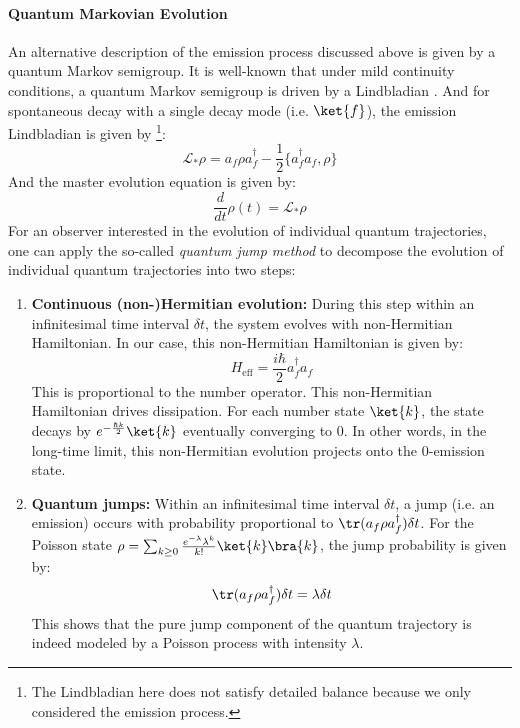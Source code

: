 \documentclass[a4paper,11pt]{article}
\theoremstyle{definition}
\numberwithin{equation}{section}
\begin{document}
\paragraph{Quantum Markovian Evolution} An alternative description of the emission process discussed above is given by a quantum Markov semigroup. It is well-known that under mild continuity conditions, a quantum Markov semigroup is driven by a Lindbladian \cite{lindbladian, davies, davies2, davies3, cipriani}. And for spontaneous decay with a single decay mode (i.e. $\ket{f}$), the emission Lindbladian is given by \footnote{The Lindbladian here does not satisfy detailed balance because we only considered the emission process.}:
\begin{equation}
    \mathcal{L}_*\rho = a_f\rho a_f^\dagger - \frac{1}{2}\{a^\dagger_fa_f, \rho\}
\end{equation}
And the master evolution equation is given by:
\begin{equation}
    \frac{d}{dt}\rho(t) = \mathcal{L}_*\rho
\end{equation}
For an observer interested in the evolution of individual quantum trajectories, one can apply the so-called \textit{quantum jump method} to decompose the evolution of individual quantum trajectories into two steps:
\begin{enumerate}
    \item \textbf{Continuous (non-)Hermitian evolution:} During this step within an infinitesimal time interval $\delta t$, the system evolves with non-Hermitian Hamiltonian. In our case, this non-Hermitian Hamiltonian is given by:
    \begin{equation}
        H_\text{eff} = \frac{i\hbar}{2}a^\dagger_fa_f
    \end{equation}
    This is proportional to the number operator. This non-Hermitian Hamiltonian drives dissipation. For each number state $\ket{k}$, the state decays by $e^{-\frac{\hbar k}{2}}\ket{k}$ eventually converging to $0$. In other words, in the long-time limit, this non-Hermitian evolution projects onto the $0$-emission state. 
    \item \textbf{Quantum jumps:} Within an infinitesimal time interval $\delta t$, a jump (i.e. an emission) occurs with probability proportional to $\tr(a_f\rho a_f^\dagger)\delta t$. For the Poisson state $\rho = \sum_{k\geq 0}\frac{e^{-\lambda}\lambda^k}{k!}\ket{k}\bra{k}$, the jump probability is given by:
    \begin{equation}
        \tr(a_f\rho a^\dagger_f)\delta t = \lambda \delta t
    \end{equation}
    This shows that the pure jump component of the quantum trajectory is indeed modeled by a Poisson process with intensity $\lambda$.
\end{enumerate}
\end{document}
